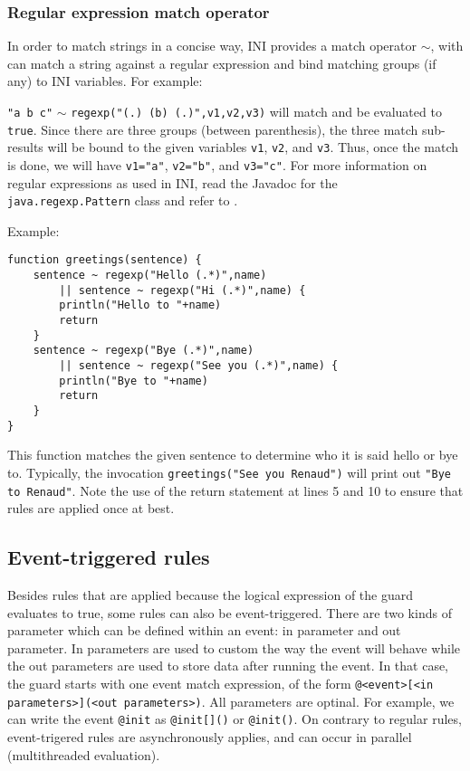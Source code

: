 \documentclass[11pt]{article}
\begin{document}
\subsubsection{Regular expression match operator\label{subsubsec:regexp}}

In order to match strings in a concise way, INI provides a match operator $\sim$, with can match a string against a regular expression \cite{friedl2006} and bind matching groups (if any) to INI variables. For example:

\texttt{"a b c"} $\sim$ \texttt{regexp("(.) (b) (.)",v1,v2,v3)} will match and be evaluated to \texttt{true}. Since there are three groups (between parenthesis), the three match sub-results will be bound to the given variables \texttt{v1}, \texttt{v2}, and \texttt{v3}. Thus, once the match is done, we will have \texttt{v1="a"}, \texttt{v2="b"}, and \texttt{v3="c"}. For more information on regular expressions as used in INI, read the Javadoc for the \texttt{java.regexp.Pattern} class and refer to \cite{friedl2006}.

Example:

\begin{lstlisting}
function greetings(sentence) {
	sentence ~ regexp("Hello (.*)",name)
		|| sentence ~ regexp("Hi (.*)",name) {
		println("Hello to "+name)
		return
	}
	sentence ~ regexp("Bye (.*)",name)
		|| sentence ~ regexp("See you (.*)",name) {
		println("Bye to "+name)
		return
	}
}
\end{lstlisting}

This function matches the given sentence to determine who it is said hello or bye to. Typically, the invocation \texttt{greetings("See you Renaud")} will print out \texttt{"Bye to Renaud"}. Note the use of the return statement at lines 5 and 10 to ensure that rules are applied once at best.

\subsection{Event-triggered rules}

Besides rules that are applied because the logical expression of the guard evaluates to true, some rules can also be event-triggered. There are two kinds of parameter which can be defined within an event: in parameter and out parameter. In parameters are used to custom the way the event will behave while the out parameters are used to store data after running the event. In that case, the guard starts with one event match expression, of the form \texttt{@<event>[<in parameters>](<out parameters>)}. All parameters are optinal. For example, we can write the event \texttt{@init} as \texttt{@init[]()} or \texttt{@init()}. On contrary to regular rules, event-trigered rules are asynchronously applies, and can occur in parallel (multithreaded evaluation).
\end{document}
